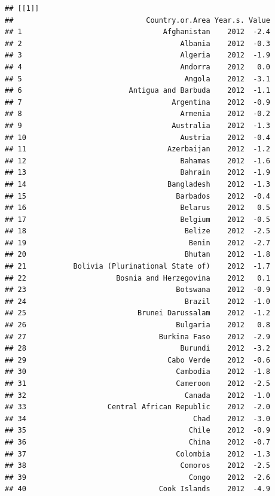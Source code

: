 \documentclass[
]{book}
\begin{document}
\begin{verbatim}
## [[1]]
##                               Country.or.Area Year.s. Value
## 1                                 Afghanistan    2012  -2.4
## 2                                     Albania    2012  -0.3
## 3                                     Algeria    2012  -1.9
## 4                                     Andorra    2012   0.0
## 5                                      Angola    2012  -3.1
## 6                         Antigua and Barbuda    2012  -1.1
## 7                                   Argentina    2012  -0.9
## 8                                     Armenia    2012  -0.2
## 9                                   Australia    2012  -1.3
## 10                                    Austria    2012  -0.4
## 11                                 Azerbaijan    2012  -1.2
## 12                                    Bahamas    2012  -1.6
## 13                                    Bahrain    2012  -1.9
## 14                                 Bangladesh    2012  -1.3
## 15                                   Barbados    2012  -0.4
## 16                                    Belarus    2012   0.5
## 17                                    Belgium    2012  -0.5
## 18                                     Belize    2012  -2.5
## 19                                      Benin    2012  -2.7
## 20                                     Bhutan    2012  -1.8
## 21           Bolivia (Plurinational State of)    2012  -1.7
## 22                     Bosnia and Herzegovina    2012   0.1
## 23                                   Botswana    2012  -0.9
## 24                                     Brazil    2012  -1.0
## 25                          Brunei Darussalam    2012  -1.2
## 26                                   Bulgaria    2012   0.8
## 27                               Burkina Faso    2012  -2.9
## 28                                    Burundi    2012  -3.2
## 29                                 Cabo Verde    2012  -0.6
## 30                                   Cambodia    2012  -1.8
## 31                                   Cameroon    2012  -2.5
## 32                                     Canada    2012  -1.0
## 33                   Central African Republic    2012  -2.0
## 34                                       Chad    2012  -3.0
## 35                                      Chile    2012  -0.9
## 36                                      China    2012  -0.7
## 37                                   Colombia    2012  -1.3
## 38                                    Comoros    2012  -2.5
## 39                                      Congo    2012  -2.6
## 40                               Cook Islands    2012  -4.9

\end{verbatim}
\end{document}

